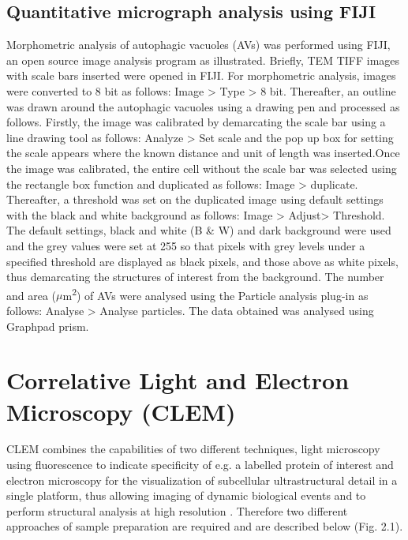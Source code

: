 \subsection{Quantitative micrograph analysis using FIJI}
Morphometric analysis of autophagic vacuoles (AVs) \citep{Kawaoka2017,Swanlund2010} was performed using FIJI, an open source image analysis program as illustrated. Briefly, TEM TIFF images with scale bars inserted were opened in FIJI. For morphometric analysis, images were converted to 8 bit as follows: Image > Type > 8 bit. Thereafter, an outline was drawn around the autophagic vacuoles using a drawing pen and processed as follows. Firstly, the image was calibrated by demarcating the scale bar using a line drawing tool as follows: Analyze > Set scale and the pop up box for setting the scale appears where the known distance and unit of length was inserted.Once the image was calibrated, the entire cell without the scale bar was selected using the rectangle box function and duplicated as follows: Image > duplicate. Thereafter, a threshold was set on the duplicated image using default settings with the black and white background as follows: Image > Adjust> Threshold. The default settings, black and white (B \& W) and dark background were used and the grey values were set at 255 so that pixels with grey levels under a specified threshold are displayed as black pixels, and those above as white pixels, thus demarcating the structures of interest from the background. The number and area ($\mu$m\textsuperscript{2}) of AVs were analysed using the Particle analysis plug-in as follows: Analyse > Analyse particles. The data obtained was analysed using Graphpad prism. 

\section{Correlative Light and Electron Microscopy (CLEM)} 
CLEM combines the capabilities of two different techniques, light microscopy using fluorescence to indicate specificity of e.g. a labelled protein of interest and electron microscopy for the visualization of subcellular ultrastructural detail in a single platform, thus allowing imaging of dynamic biological events and to perform structural analysis at high resolution \citep{Russell2017}. Therefore two different approaches of sample preparation are required and are described below (Fig. 2.1). 


